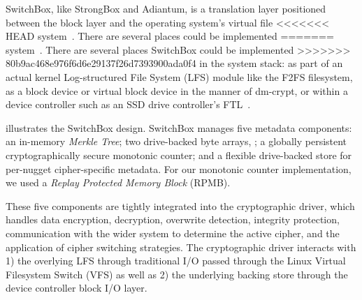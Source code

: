  

SwitchBox, like StrongBox and Adiantum, is a translation layer positioned
between the block layer and the operating system's virtual file
<<<<<<< HEAD
system~\cite{StrongBox,Adiantum}. There are several places \SYSTEM{} could be implemented
=======
system~\cite{StrongBox}. There are several places SwitchBox could be implemented
>>>>>>> 80b9ac468e976f6d6e29137f26d7393900ada0f4
in the system stack: as part of an actual kernel Log-structured File System
(LFS) module like the F2FS filesystem, as a block device or virtual block device
in the manner of dm-crypt, or within a device controller such as an SSD drive
controller's FTL~\cite{StrongBox}.

 illustrates the SwitchBox design. SwitchBox manages five
metadata components: an in-memory \emph{Merkle Tree}; two drive-backed byte
arrays, ; a
globally persistent cryptographically secure monotonic counter; and a flexible
drive-backed store for per-nugget cipher-specific metadata. For our monotonic
counter implementation, we used a \emph{Replay Protected Memory Block} (RPMB).

These five components are tightly integrated into the cryptographic driver,
which handles data encryption, decryption, overwrite detection, integrity
protection, communication with the wider system to determine the active cipher,
and the application of cipher switching strategies. The cryptographic driver
interacts with 1) the overlying LFS through traditional I/O passed through the
Linux Virtual Filesystem Switch (VFS) as well as 2) the underlying backing store
through the device controller block I/O layer.

